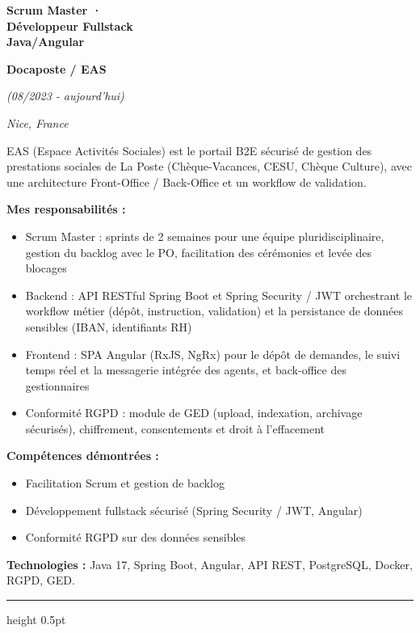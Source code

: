\documentclass[a4paper,10pt]{article}
\newcommand{\dcsub}[1]{%
  \par\vspace{2.1mm}%
  \noindent\textbf{#1}\par
  \vspace{0.4mm}%
}
\newcommand{\dctech}[1]{%
  \par\vspace{2.0mm}%
  \noindent\textbf{Technologies :} #1\par
}
\newlength{\dcleftw}\setlength{\dcleftw}{51.2mm}
\newlength{\dcgap}\setlength{\dcgap}{2.8mm}
\newcommand{\dcexperience}[2]{%
  \par\noindent
  \begin{minipage}[t]{\dcleftw}
    \raggedright #1
  \end{minipage}%
  \hspace{\dcgap}%
  \begin{minipage}[t]{\dimexpr\textwidth-\dcleftw-\dcgap\relax}
    \raggedright\color{dcbody}#2
  \end{minipage}%
  \par
}
\newcommand{\dcjob}[4]{%
  {\fontsize{11.2}{13.4}\selectfont\bfseries\color{dcnavy}#1}\par
  \vspace{0.7mm}%
  {\fontsize{10}{12}\selectfont\bfseries\color{dcnavy}#2}\par
  \vspace{0.9mm}%
  {\fontsize{8.2}{10}\selectfont\itshape\color{dcmuted}(#3)}\par
  \vspace{0.35mm}%
  {\fontsize{7.8}{9.5}\selectfont\itshape\color{dcgoldsoft}#4}\par
}
\newcommand{\dcrule}{%
  \par\vspace{4.2mm}%
  {\color{dcgold}\hrule height 0.5pt}\par
  \vspace{4.2mm}%
}
\begin{document}
\dcexperience{%
  \dcjob{Scrum Master ·\\Développeur Fullstack\\Java/Angular}%
        {Docaposte / EAS}%
        {08/2023 - aujourd'hui}%
        {Nice, France}
}{%
  EAS (Espace Activités Sociales) est le portail B2E sécurisé de gestion des prestations
  sociales de La Poste (Chèque-Vacances, CESU, Chèque Culture), avec une architecture
  Front-Office / Back-Office et un workflow de validation.

  \dcsub{Mes responsabilités :}
  \begin{itemize}
    \item Scrum Master : sprints de 2 semaines pour une équipe pluridisciplinaire, gestion du
          backlog avec le PO, facilitation des cérémonies et levée des blocages
    \item Backend : API RESTful Spring Boot et Spring Security / JWT orchestrant le workflow
          métier (dépôt, instruction, validation) et la persistance de données sensibles (IBAN,
          identifiants RH)
    \item Frontend : SPA Angular (RxJS, NgRx) pour le dépôt de demandes, le suivi temps réel
          et la messagerie intégrée des agents, et back-office des gestionnaires
    \item Conformité RGPD : module de GED (upload, indexation, archivage sécurisés),
          chiffrement, consentements et droit à l'effacement
  \end{itemize}

  \dcsub{Compétences démontrées :}
  \begin{itemize}
    \item Facilitation Scrum et gestion de backlog
    \item Développement fullstack sécurisé (Spring Security / JWT, Angular)
    \item Conformité RGPD sur des données sensibles
  \end{itemize}

  \dctech{Java 17, Spring Boot, Angular, API REST, PostgreSQL, Docker, RGPD, GED.}
}

\dcrule
\end{document}
